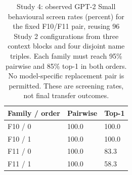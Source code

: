 
\begin{table}[H]
\centering\footnotesize
\setlength{\tabcolsep}{3pt}
\caption{Study 4: observed GPT-2 Small behavioural screen rates (percent) for the fixed F10/F11 pair, reusing 96 Study 2 configurations from three context blocks and four disjoint name triples. Each family must reach 95\% pairwise and 85\% top-1 in both orders. No model-specific replacement pair is permitted. These are screening rates, not final transfer outcomes.}
\label{tab:small-gates}
\begin{tabularx}{\linewidth}{@{}lYY@{}}
\toprule
Family / order & Pairwise & Top-1 \\
\midrule
F10 / 0 & 100.0 & 100.0 \\
F10 / 1 & 100.0 & 100.0 \\
F11 / 0 & 100.0 & 83.3 \\
F11 / 1 & 100.0 & 58.3 \\
\bottomrule
\end{tabularx}
\end{table}
